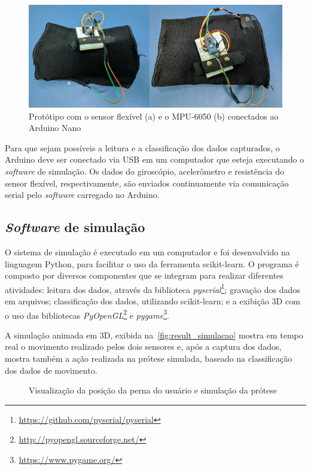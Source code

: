 \begin{figure}[ht]
	\caption{\label{fig:result_prototipo}Protótipo com o sensor flexível (a) e o MPU-6050 (b) conectados ao Arduino Nano}
	\begin{center}
	    \includegraphics[width=.8\textwidth]{resources/result_prototipo}
	\end{center}
\end{figure}

Para que sejam possíveis a leitura e a classificação dos dados capturados, o Arduino deve ser conectado via USB em um computador que esteja executando o \textit{software} de simulação. Os dados do giroscópio, acelerômetro e resistência do sensor flexível, respectivamente, são enviados continuamente via comunicação serial pelo \textit{software} carregado no Arduino.

\subsection{\textit{Software} de simulação}\label{sec:result_simulacao}
O sistema de simulação é executado em um computador e foi desenvolvido na linguagem Python, para facilitar o uso da ferramenta scikit-learn. O programa é composto por diversos componentes que se integram para realizar diferentes atividades: leitura dos dados, através da biblioteca \textit{pyserial}\footnote{\url{https://github.com/pyserial/pyserial}}; gravação dos dados em arquivos; classificação dos dados, utilizando scikit-learn; e a exibição 3D com o uso das bibliotecas \textit{PyOpenGL}\footnote{\url{http://pyopengl.sourceforge.net/}} e \textit{pygame}\footnote{\url{https://www.pygame.org/}}.

A simulação animada em 3D, exibida na~\autoref{fig:result_simulacao} mostra em tempo real o movimento realizado pelos dois sensores e, após a captura dos dados, mostra também a ação realizada na prótese simulada, baseado na classificação dos dados de movimento.

\begin{figure}[ht]
	\caption{\label{fig:result_simulacao}Visualização da posição da perna do usuário e simulação da prótese}
	\begin{center}
	\end{center}
\end{figure}

